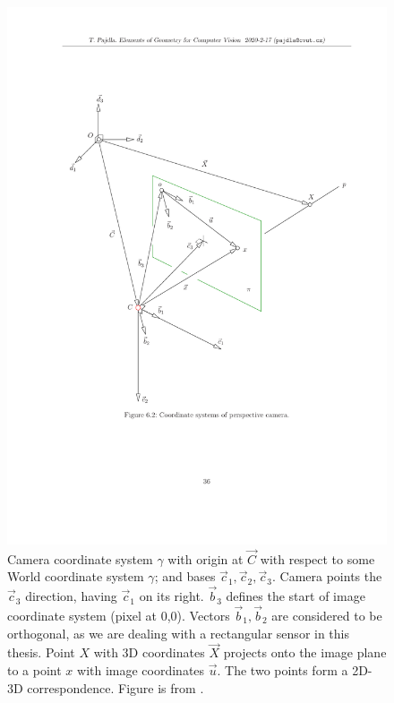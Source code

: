 \documentclass[twoside]{ctuthesis}
\theoremstyle{plain}
\theoremstyle{definition}
\theoremstyle{note}
\begin{document}
\begin{figure}[htb!]
	\centering
	\includegraphics[width=1.0\textwidth,viewport=2.93cm 7.54cm 19.49cm 25.3cm,clip]{GVG_page_cameraCS.pdf}
	\caption{Camera coordinate system $\gamma$ with origin at $\vec C$ with respect to some World coordinate system $\gamma$; and bases $\vec c_1, \vec c_2, \vec c_3$. Camera points the $\vec c_3$ direction, having $\vec c_1$ on its right. $\vec b_3$ defines the start of image coordinate system (pixel at 0,0). Vectors $\vec b_1, \vec b_2$ are considered to be orthogonal, as we are dealing with a rectangular sensor in this thesis. Point $X$ with 3D coordinates $\vec X$ projects onto the image plane to a point $x$ with image coordinates $\vec u$. The two points form a 2D-3D correspondence. Figure is from \cite{GVG}.}
	\label{fig:cameraCoordinateSystem}
\end{figure}
\end{document}
